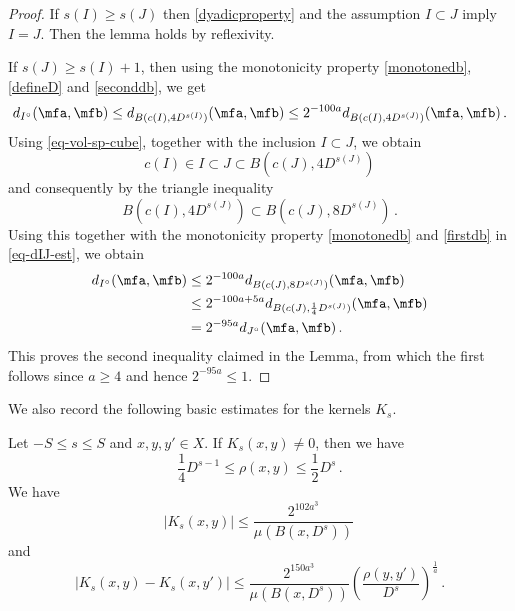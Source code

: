 \begin{proof}
    \leanok
    If $s(I) \ge s(J)$ then \eqref{dyadicproperty} and the assumption $I\subset J$ imply $I = J$. Then the lemma holds by reflexivity.

    If $s(J) \ge s(I)+1$, then using the monotonicity property \eqref{monotonedb}, \eqref{defineD} and \eqref{seconddb}, we get
    \begin{equation}
    \label{eq-dIJ-est}
        d_{I^\circ}(\mfa, \mfb) \le d_{B(c(I), 4 D^{s(I)})}(\mfa, \mfb) \le 2^{-100a} d_{B(c(I), 4D^{s(J)})}(\mfa, \mfb)\,.
    \end{equation}
    Using \eqref{eq-vol-sp-cube}, together with the inclusion $I \subset J$, we obtain
    $$
        c(I) \in I \subset J \subset B(c(J), 4 D^{s(J)})
    $$
    and consequently by the triangle inequality
    $$
        B(c(I), 4 D^{s(J)}) \subset B(c(J), 8 D^{s(J)})\,.
    $$
    Using this together with the monotonicity property \eqref{monotonedb} and \eqref{firstdb} in \eqref{eq-dIJ-est}, we obtain
    \begin{align*}
        d_{I^\circ}(\mfa, \mfb) &\le 2^{-100a} d_{B(c(J), 8D^{s(J)})}(\mfa, \mfb)\\
        &\le 2^{-100a + 5a} d_{B(c(J), \frac{1}{4}D^{s(J)})}(\mfa, \mfb)\\
        &= 2^{-95a}d_{J^\circ}(\mfa, \mfb)\,.
    \end{align*}
    This proves the second inequality claimed in the Lemma, from which the first follows since $a \ge 4$ and hence $2^{-95a} \le 1$.
\end{proof}

We also record the following basic estimates for the kernels $K_s$.

\begin{lemma}
\label{kernel-summand}
\leanok
{}
    Let $-S\le s\le S$ and $x,y,y'\in X$.
    If $K_s(x,y)\neq 0$, then we have
    \begin{equation}\label{supp-Ks}
      \frac{1}{4} D^{s-1} \leq \rho(x,y) \leq \frac{1}{2} D^s\, .
    \end{equation}
    We have
    \begin{equation}
       \label{eq-Ks-size}
        |K_s(x,y)|\le \frac{2^{102 a^3}}{\mu(B(x, D^{s}))}\,
    \end{equation}
    and
    \begin{equation}
        \label{eq-Ks-smooth}
        |K_s(x,y)-K_s(x, y')|\le \frac{2^{150a^3}}{\mu(B(x, D^{s}))}
        \left(\frac{ \rho(y,y')}{D^s}\right)^{\frac 1a}\,.
    \end{equation}
\end{lemma}

